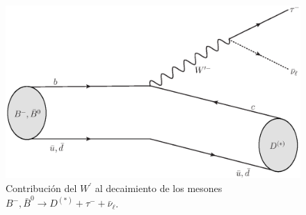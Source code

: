 %
\begin{figure}
\centering
\includegraphics[scale=0.6]{figures/BWp_decay}
\caption{Contribución del $W^{\prime}$ al decaimiento de los mesones $B^{-}, \bar{B}^{0} \to D^{(*)} + \tau^{-} + \bar{\nu}_{\ell}$.}
\label{Fig:BWp_decay}
\end{figure}
%
